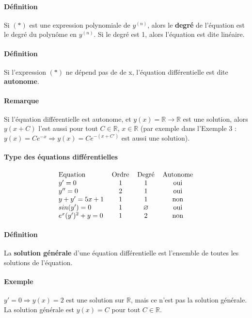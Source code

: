 \message{ !name(analyse-02.tex)}\documentclass[1Opt]{report}
\begin{document}
\paragraph{Définition}
Si $(\ast)$ est une expression polynomiale de $y^{(n)}$, alors le \textbf{degré} de
l'équation est le degré du polynôme en $y^{(n)}$. Si le degré est 1, alors
l'équation est dite linéaire.

\paragraph{Définition}
Si l'expression $(\ast)$ ne dépend pas de de x, l'équation différentielle est
dite \textbf{autonome}.

\paragraph{Remarque}
Si l'équation différentielle est autonome, et
$y(x)={\mathbb R}\rightarrow{\mathbb R}$ est une solution, alors $y(x+C)$ l'est
aussi pour tout $C\in{\mathbb R},\,x\in{\mathbb R}$ (par exemple dans l'Exemple
3 : $y(x)=Ce^{-x}\Rightarrow y(x)=Ce^{-(x+C')}$ est aussi une solution).

\paragraph{Type des équations différentielles}
\begin{eqnarray*}
  \begin{tabular}{l c c c}
    Equation & Ordre & Degré & Autonome \\
    $y'=0$ & 1 & 1 & oui \\
    $y''=0$ & 2 & 1 & oui \\
    $y+y'=5x+1$ & 1 & 1 & non \\
    $sin(y')=0$ & 1 & $\varnothing$ & oui \\
    $e^x(y')^2+y=0$ & 1 & 2 & non
  \end{tabular}
\end{eqnarray*}

\paragraph{Définition}
La \textbf{solution générale} d'une équation différentielle est l'ensemble de
toutes les solutions de l'équation.

\paragraph{Exemple}
$y'=0\Rightarrow y(x)=2$ est une solution sur ${\mathbb R}$, mais ce n'est pas
la solution générale. La solution générale est $y(x)=C$ pour tout
$C\in{\mathbb R}$.
\end{document}
